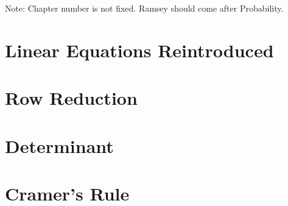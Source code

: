 Note: Chapter number is not fixed. Ramsey should come after Probability.
\section{Linear Equations Reintroduced}


\section{Row Reduction}

\section{Determinant}

\section{Cramer's Rule}
